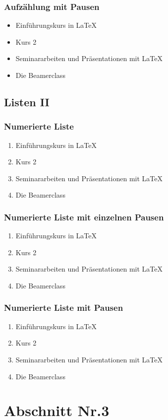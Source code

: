 \documentclass[hyperref={pdfpagelabels=false}]{beamer}
\begin{document}
\begin{frame}
\frametitle{Aufz\"ahlung mit Pausen}
\begin{itemize}[<+->]
\item  Einf\"uhrungskurs in \LaTeX{} 
\item  Kurs 2 
\item  Seminararbeiten und Pr\"asentationen mit \LaTeX{} 
\item  Die Beamerclass
\end{itemize} 
\end{frame}


\subsection{Listen II}
\begin{frame}
\frametitle{Numerierte Liste}
\begin{enumerate}
\item  Einf\"uhrungskurs in \LaTeX{} 
\item  Kurs 2
\item  Seminararbeiten und Pr\"asentationen mit \LaTeX{} 
\item  Die Beamerclass
\end{enumerate}
\end{frame}

\begin{frame}
\frametitle{Numerierte Liste mit einzelnen Pausen}
\begin{enumerate}
\item  Einf\"uhrungskurs in \LaTeX{} \pause 
\item  Kurs 2 \pause 
\item  Seminararbeiten und Pr\"asentationen mit \LaTeX{} \pause 
\item  Die Beamerclass
\end{enumerate}
\end{frame}

\begin{frame}
\frametitle{Numerierte Liste mit  Pausen}
\begin{enumerate}[<+->]
\item  Einf\"uhrungskurs in \LaTeX{} 
\item  Kurs 2 
\item  Seminararbeiten und Pr\"asentationen mit \LaTeX{} 
\item  Die Beamerclass
\end{enumerate}
\end{frame}

\section{Abschnitt Nr.3} 
\end{document}
